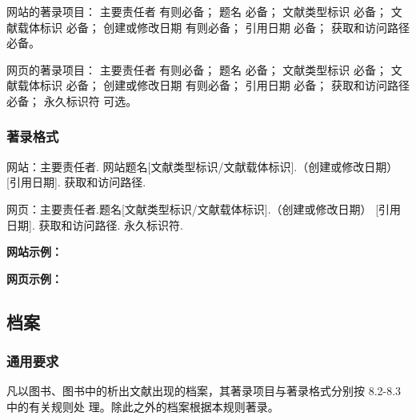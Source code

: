 \documentclass{article}
\begin{document}
网站的著录项目：
主要责任者 有则必备；
题名 必备；
文献类型标识 必备；
文献载体标识 必备；
创建或修改日期 有则必备；
引用日期 必备；
获取和访问路径 必备。

网页的著录项目：
主要责任者 有则必备；
题名 必备；
文献类型标识 必备；
文献载体标识 必备；
创建或修改日期 有则必备；
引用日期 必备；
获取和访问路径 必备；
永久标识符 可选。

\subsubsection{著录格式}

网站：主要责任者. 网站题名[文献类型标识/文献载体标识].（创建或修改日期） [引用日期]. 获取和访问路径.

网页：主要责任者.题名[文献类型标识/文献载体标识].（创建或修改日期） [引用日期]. 获取和访问路径. 永久标识符.


\begin{refsection}

\nocite{鲁迅博物馆2023,
BBC2020a,
BBC2020b}


{


\textbf{网站示例：}

{\printbibliography[heading=none,env=indentegenv]}
}
\end{refsection}

\begin{refsection}

\nocite{北京市人民政府办公厅2005--,鲁迅博物馆2021,
杨立华2022,ISOHOME2020,ANTONIO2019,BEVINGTON2025,昨日之歌2015,
Zotero2024,仉尚航2024}


{


\textbf{网页示例：}

{\printbibliography[heading=none,env=indentegenv]}
}
\end{refsection}


\subsection{档案}

\subsubsection{通用要求}

凡以图书、图书中的析出文献出现的档案，其著录项目与著录格式分别按 8.2-8.3 中的有关规则处
理。除此之外的档案根据本规则著录。
\end{document}
